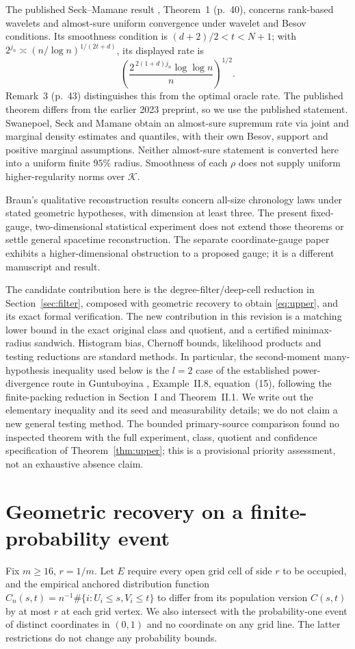 \documentclass[11pt]{article}
\theoremstyle{remark}
\newcommand{\K}{\mathcal K}
\begin{document}
The published Seck--Mamane result \cite{SeckMamane}, Theorem~1
(p.~40), concerns rank-based wavelets and almost-sure uniform
convergence under wavelet and Besov conditions. Its smoothness
condition is $(d+2)/2<t<N+1$; with
$2^{j_n}\asymp(n/\log n)^{1/(2t+d)}$, its displayed rate is
\[
 \left(\frac{2^{\,2(1+d)j_n}\log\log n}{n}\right)^{1/2}.
\]
Remark~3 (p.~43) distinguishes this from the optimal oracle rate.
The published theorem differs from the earlier 2023 preprint, so we
use the published statement. Swanepoel, Seck and Mamane \cite{Swanepoel}
obtain an almost-sure supremum rate via joint and marginal density
estimates and quantiles, with their own Besov, support and positive
marginal assumptions. Neither almost-sure statement is converted
here into a uniform finite $95\%$ radius. Smoothness of each $\rho$
does not supply uniform higher-regularity norms over $\K$.

Braun's qualitative reconstruction results \cite{Braun} concern
all-size chronology laws under stated geometric hypotheses, with
dimension at least three. The present fixed-gauge, two-dimensional
statistical experiment does not extend those theorems or settle
general spacetime reconstruction. The separate coordinate-gauge
paper \cite{Gauge} exhibits a higher-dimensional obstruction to a
proposed gauge; it is a different manuscript and result.

The candidate contribution here is the degree-filter/deep-cell
reduction in Section~\ref{sec:filter}, composed with geometric
recovery to obtain \eqref{eq:upper}, and its exact formal verification.
The new contribution in this revision is a matching lower bound in
the exact original class and quotient, and a certified minimax-radius
sandwich. Histogram bias, Chernoff bounds, likelihood products and
testing reductions are standard methods. In particular, the
second-moment many-hypothesis inequality used below is the $l=2$
case of the established power-divergence route in Guntuboyina
\cite{Guntuboyina}, Example~II.8, equation~(15), following the
finite-packing reduction in Section~I and Theorem~II.1. We write out
the elementary inequality and its seed and measurability details;
we do not claim a new general testing method. The bounded primary-source comparison
found no inspected theorem with the full experiment, class, quotient
and confidence specification of Theorem~\ref{thm:upper}; this is a
provisional priority assessment, not an exhaustive absence claim.

\section{Geometric recovery on a finite-probability event}
\label{sec:geometry}
Fix $m\ge16$, $r=1/m$. Let $E$ require every open grid cell of side $r$
to be occupied, and the empirical anchored distribution function
$C_n(s,t)=n^{-1}\#\{i:U_i\le s,V_i\le t\}$ to differ from its population
version $C(s,t)$ by at most $r$ at each grid vertex.
We also intersect with the probability-one event of distinct
coordinates in $(0,1)$ and no coordinate on any grid line.
The latter restrictions do not change any probability bounds.
\end{document}
